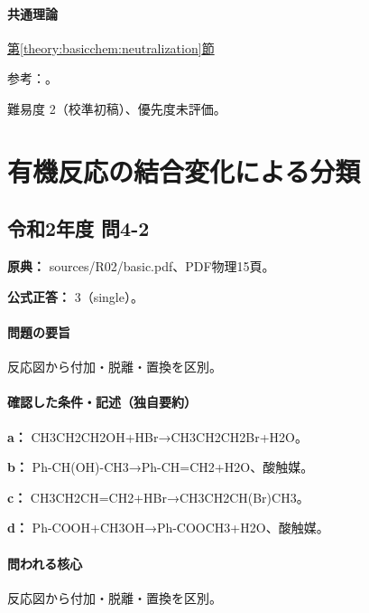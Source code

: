 \paragraph{共通理論} \hyperref[theory:basicchem:neutralization]{第\ref*{theory:basicchem:neutralization}節}

\par 参考：\cite{chem55_hydrolysis}。

\par 難易度 2（校準初稿）、優先度未評価。

\section{有機反応の結合変化による分類}

\subsection{令和2年度 問4-2}
\label{q:r02-reg-basic-4-2}

\noindent\textbf{原典：} sources/R02/basic.pdf、PDF物理15頁。

\textbf{公式正答：} 3（single）。

\paragraph{問題の要旨} 反応図から付加・脱離・置換を区別。

\paragraph{確認した条件・記述（独自要約）}\mbox{}\par

\noindent\textbf{a：} CH3CH2CH2OH+HBr→CH3CH2CH2Br+H2O。\par

\noindent\textbf{b：} Ph-CH(OH)-CH3→Ph-CH=\allowbreak{}CH2+H2O、酸触媒。\par

\noindent\textbf{c：} CH3CH2CH=\allowbreak{}CH2+HBr→CH3CH2CH(Br)CH3。\par

\noindent\textbf{d：} Ph-COOH+CH3OH→Ph-COOCH3+H2O、酸触媒。\par

\paragraph{問われる核心} 反応図から付加・脱離・置換を区別。

